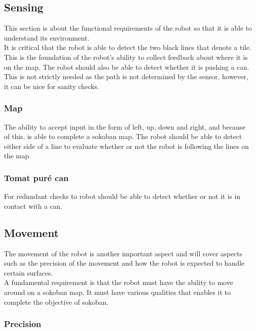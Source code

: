 \documentclass[../../main.tex]{subfiles}
\begin{document}
\subsection{Sensing}%
\label{sub:sensing}

This section is about the functional requirements of the robot so that it is able to understand its environment. \\
It is critical that the robot is able to detect the two black lines that denote a tile. This is the foundation of the robot's ability to collect feedback about where it is on the map.
The robot should also be able to detect whether it is pushing a can. This is not strictly needed as the path is not determined by the sensor, however, it can be nice for sanity checks.

\subsubsection{Map}%
\label{ssub:map}

The ability to accept input in the form of left, up, down and right, and because of this, is able to complete a sokoban map.
The robot should be able to detect either side of a line to evaluate whether or not the robot is following the lines on the map.

\subsubsection{Tomat puré can}%
\label{ssub:tomat_pure_can}

For redundant checks to robot should be able to detect whether or not it is in contact with a can.

\subsection{Movement}%
\label{sub:movement}

The movement of the robot is another important aspect and will cover aspects such as the precision of the movement and how the robot is expected to handle certain surfaces. \\
A fundamental requirement is that the robot must have the ability to move around on a sokoban map. It must have various qualities that enables it to complete the objective of sokoban.

\subsubsection{Precision}%
\label{ssub:precision}
\end{document}
